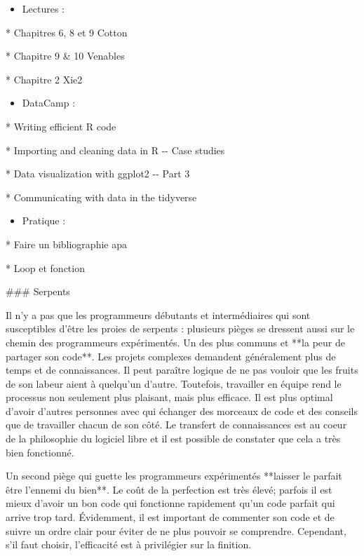 \documentclass[
  letterpaper,
]{scrbook}
\providecommand{\tightlist}{%
  \setlength{\itemsep}{0pt}\setlength{\parskip}{0pt}}\usepackage{longtable,booktabs,array}
\begin{document}
\begin{itemize}
\tightlist
\item
  Lectures :
\end{itemize}

* Chapitres 6, 8 et 9 Cotton

* Chapitre 9 \& 10 Venables

* Chapitre 2 Xie2

\begin{itemize}
\tightlist
\item
  DataCamp :
\end{itemize}

* Writing efficient R code

* Importing and cleaning data in R -\/- Case studies

* Data visualization with ggplot2 -\/- Part 3

* Communicating with data in the tidyverse

\begin{itemize}
\tightlist
\item
  Pratique :
\end{itemize}

* Faire un bibliographie apa

* Loop et fonction

\#\#\# Serpents

Il n'y a pas que les programmeurs débutants et intermédiaires qui sont
susceptibles d'être les proies de serpents : plusieurs pièges se
dressent aussi sur le chemin des programmeurs expérimentés. Un des plus
communs et **la peur de partager son code**. Les projets complexes
demandent généralement plus de temps et de connaissances. Il peut
paraître logique de ne pas vouloir que les fruits de son labeur aient à
quelqu'un d'autre. Toutefois, travailler en équipe rend le processus non
seulement plus plaisant, mais plus efficace. Il est plus optimal d'avoir
d'autres personnes avec qui échanger des morceaux de code et des
conseils que de travailler chacun de son côté. Le transfert de
connaissances est au coeur de la philosophie du logiciel libre et il est
possible de constater que cela a très bien fonctionné.

Un second piège qui guette les programmeurs expérimentés **laisser le
parfait être l'ennemi du bien**. Le coût de la perfection est très
élevé; parfois il est mieux d'avoir un bon code qui fonctionne
rapidement qu'un code parfait qui arrive trop tard. Évidemment, il est
important de commenter son code et de suivre un ordre clair pour éviter
de ne plus pouvoir se comprendre. Cependant, s'il faut choisir,
l'efficacité est à privilégier sur la finition.
\end{document}
